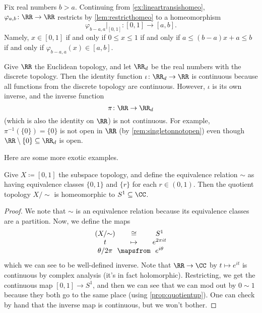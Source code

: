 \documentclass[../notes.tex]{subfiles}
\begin{document}
\begin{example} \label{ex:closedintervalhomeo}
	Fix real numbers $b>a$. Continuing from \autoref{ex:lineartransishomeo}, $\varphi_{a,b}\colon\RR\to\RR$ restricts by \autoref{lem:restricthomeo} to a homeomorphism
	\[\varphi_{b-a,a}|_{[0,1]}\colon[0,1]\to[a,b].\]
	Namely, $x\in[0,1]$ if and only if $0\le x\le 1$ if and only if $a\le (b-a)x+a\le b$ if and only if $\varphi_{b-a,a}(x)\in[a,b]$.
\end{example}
\begin{example}
	Give $\RR$ the Euclidean topology, and let $\RR_d$ be the real numbers with the discrete topology. Then the identity function $\iota\colon\RR_d\to\RR$ is continuous because all functions from the discrete topology are continuous. However, $\iota$ is its own inverse, and the inverse function
	\[\pi\colon\RR\to\RR_d\]
	(which is also the identity on $\RR$) is not continuous. For example, $\pi^{-1}(\{0\})=\{0\}$ is not open in $\RR$ (by \autoref{rem:singletonnotopen}) even though $\RR\setminus\{0\}\subseteq\RR_d$ is open.
\end{example}
Here are some more exotic examples.
\begin{exe}
	Give $X\coloneqq[0,1]$ the subspace topology, and define the equivalence relation $\sim$ as having equivalence classes $\{0,1\}$ and $\{r\}$ for each $r\in(0,1)$. Then the quotient topology $X/{\sim}$ is homeomorphic to $S^1\subseteq\CC$.
\end{exe}
\begin{proof}
	We note that $\sim$ is an equivalence relation because its equivalence classes are a partition. Now, we define the maps
	\[\arraycolsep=1.4pt\begin{array}{ccc}
		(X/{\sim}) &\cong& S^1 \\
		t &\mapsto& e^{2\pi it} \\
		\theta/2\pi &\mapsfrom& e^{i\theta}
	\end{array}\]
	which we can see to be well-defined inverse. Note that $\RR\to\CC$ by $t\mapsto e^{it}$ is continuous by complex analysis (it's in fact holomorphic). Restricting, we get the continuous map $[0,1]\to S^1$, and then we can see that we can mod out by $0\sim1$ because they both go to the same place (using \autoref{prop:quotientup}). One can check by hand that the inverse map is continuous, but we won't bother.
\end{proof}
\end{document}
